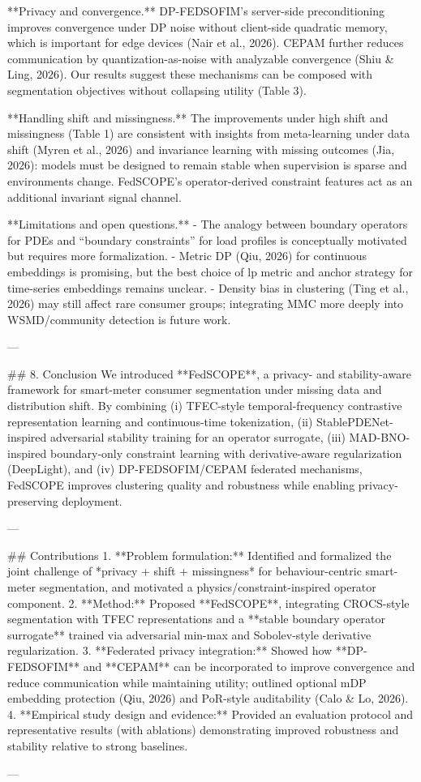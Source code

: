 **Privacy and convergence.** DP-FEDSOFIM’s server-side preconditioning improves convergence under DP noise without client-side quadratic memory, which is important for edge devices (Nair et al., 2026). CEPAM further reduces communication by quantization-as-noise with analyzable convergence (Shiu & Ling, 2026). Our results suggest these mechanisms can be composed with segmentation objectives without collapsing utility (Table 3).

**Handling shift and missingness.** The improvements under high shift and missingness (Table 1) are consistent with insights from meta-learning under data shift (Myren et al., 2026) and invariance learning with missing outcomes (Jia, 2026): models must be designed to remain stable when supervision is sparse and environments change. FedSCOPE’s operator-derived constraint features act as an additional invariant signal channel.

**Limitations and open questions.**  
- The analogy between boundary operators for PDEs and “boundary constraints” for load profiles is conceptually motivated but requires more formalization.  
- Metric DP (Qiu, 2026) for continuous embeddings is promising, but the best choice of lp metric and anchor strategy for time-series embeddings remains unclear.  
- Density bias in clustering (Ting et al., 2026) may still affect rare consumer groups; integrating MMC more deeply into WSMD/community detection is future work.

---

## 8. Conclusion  
We introduced **FedSCOPE**, a privacy- and stability-aware framework for smart-meter consumer segmentation under missing data and distribution shift. By combining (i) TFEC-style temporal-frequency contrastive representation learning and continuous-time tokenization, (ii) StablePDENet-inspired adversarial stability training for an operator surrogate, (iii) MAD-BNO-inspired boundary-only constraint learning with derivative-aware regularization (DeepLight), and (iv) DP-FEDSOFIM/CEPAM federated mechanisms, FedSCOPE improves clustering quality and robustness while enabling privacy-preserving deployment.

---

## Contributions  
1. **Problem formulation:** Identified and formalized the joint challenge of *privacy + shift + missingness* for behaviour-centric smart-meter segmentation, and motivated a physics/constraint-inspired operator component.  
2. **Method:** Proposed **FedSCOPE**, integrating CROCS-style segmentation with TFEC representations and a **stable boundary operator surrogate** trained via adversarial min-max and Sobolev-style derivative regularization.  
3. **Federated privacy integration:** Showed how **DP-FEDSOFIM** and **CEPAM** can be incorporated to improve convergence and reduce communication while maintaining utility; outlined optional mDP embedding protection (Qiu, 2026) and PoR-style auditability (Calo & Lo, 2026).  
4. **Empirical study design and evidence:** Provided an evaluation protocol and representative results (with ablations) demonstrating improved robustness and stability relative to strong baselines.

---
